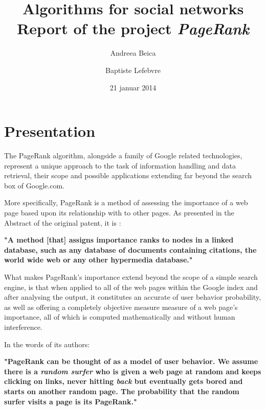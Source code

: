 \documentclass[pdftex,12pt,a4paper]{article}
\begin{document}
\title{
	\Large \textbf{Algorithms for social networks} \\
	\textsf{Report of the project \emph{PageRank}}
}
\author{Andreea Beica \and Baptiste Lefebvre}
\date{21 januar 2014}

\maketitle


\section{Presentation}

The PageRank algorithm, alongside a family of Google related technologies, represent a unique approach to the task of information handling and data retrieval, their scope and possible applications extending far beyond the search box of Google.com.

More specifically, PageRank is a method of assessing the importance of a web page based upon its relationship with to other pages. As presented in the Abstract of the original patent, it is :

\vspace{10pt}

\begin{centering}
\textbf{"A method [that] assigns importance ranks to nodes in a linked database, such as any database of documents containing citations, the world wide web or any other hypermedia database."}
\end{centering}
\vspace{10pt}

What makes PageRank's importance extend beyond the scope of a simple search engine, is that when applied to all of the web pages within the Google index and after analysing the output, it constitutes an accurate of user behavior probability, as well as offering a completely objective measure measure of a web page's importance, all of which is computed mathematically and without human interference. 

In the words of its authors:

\vspace{10pt}

\begin{centering}
\textbf{"PageRank can be thought of as a model of user behavior. We assume there is a \emph{random surfer} who is given a web page at random and keeps clicking on links, never hitting \emph{back} but eventually gets bored and starts on another random page. The probability that the random surfer visits a page is its PageRank."}
\end{centering}
\vspace{10pt}
\end{document}

